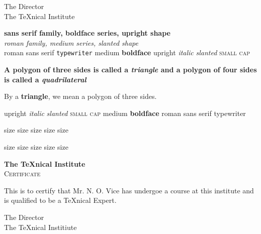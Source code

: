 \documentclass{article}
\begin{document}
\begin{flushleft}
The Director\\ The \TeX nical Institute
\end{flushleft}

\noindent \textsf{\textbf{sans serif family, boldface series, upright shape}} \\
\textrm{\textsl{roman family, medium series, slanted shape}} \\
\textrm{roman}
\textsf{sans serif}
\texttt{typewriter}
\textmd{medium}
\textbf{boldface}
\textup{upright}
\textit{italic}
\textsl{slanted}
\textsc{small cap}

\textbf{A polygon of three sides is called a \emph{triangle} and a polygon of four sides is called a \emph{quadrilateral}}

By a {\bfseries triangle}, we mean a polygon of three sides.

{\upshape upright} {\itshape italic} {\slshape slanted} {\scshape small cap} {\mdseries medium} {\bfseries boldface} {\rmfamily roman} {\sffamily sans serif}
{\ttfamily typewriter} 

{\large size} {\Large size} {\LARGE size} {\huge size} {\Huge size}

{\tiny size} {\scriptsize size} {\footnotesize size} {\small size} {\normalsize size}

\begin{center}
{\bfseries\huge The \TeX nical Institute}\\[1cm]
{\scshape\LARGE Certificate}
\end{center}

\noindent This is to certify that Mr. N. O. Vice has undergoe a course at this institute and is qualified to be a \TeX nical Expert.

\begin{flushright}
{\sffamily The Director\\ The \TeX nical Institiute}
\end{flushright}
\end{document}
